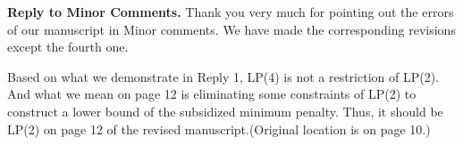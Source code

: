 \documentclass[11pt]{article}
\begin{document}
\noindent \textbf{Reply to Minor Comments.}
Thank you very much for pointing out the errors of our manuscript in Minor comments. We have made the corresponding revisions except the fourth one.

Based on what we demonstrate in Reply 1, LP(4) is not a restriction of LP(2). And what we mean on page 12 is eliminating some constraints of LP(2) to construct a lower bound of the subsidized minimum penalty. Thus, it should be LP(2) on page 12 of the revised manuscript.(Original location is on page 10.)


%
%

%
%
%
~\\[4mm]

\newpage
\end{document}
